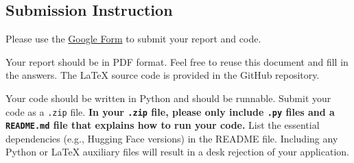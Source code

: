 \documentclass[12pt, letterpaper]{article}
\begin{document}

\subsection*{Submission Instruction}
Please use the \href{https://forms.gle/Aj8ZS8mP6veCq3267}{Google Form} to submit your report and code.

Your report should be in PDF format.
Feel free to reuse this document and fill in the answers.
The \LaTeX\xspace source code is provided in the GitHub repository.

Your code should be written in Python and should be runnable.
Submit your code as a \texttt{.zip} file.
\textbf{In your \texttt{.zip} file, please only include \texttt{.py} files and a \texttt{README.md} file that explains how to run your code.}
List the essential dependencies (e.g., Hugging Face versions) in the README file.
Including any Python or \LaTeX\xspace auxiliary files will result in a desk rejection of your application.




\end{document}
